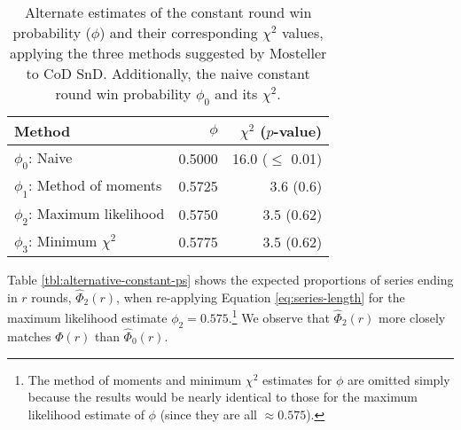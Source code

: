 \documentclass{article}
\begin{document}
\begin{table}

\caption{Alternate estimates of the constant round win probability ($\phi$) and their corresponding $\chi^2$ values, applying the three methods suggested by Mosteller to CoD SnD. Additionally, the naive constant round win probability $\phi_0$ and its $\chi^2$.}

\centering
\begin{tabular}{lrr}
\toprule
Method & $\phi$ & $\chi^2$ ($p$-value) \\
\midrule

$\phi_0$: Naive & 0.5000 & 16.0 ($\leq$ 0.01) \\
$\phi_1$: Method of moments & 0.5725 & 3.6 (0.6) \\
$\phi_2$: Maximum likelihood & 0.5750 & 3.5 (0.62) \\
$\phi_3$: Minimum $\chi^2$ & 0.5775 & 3.5 (0.62) \\

\bottomrule
\end{tabular}

\label{tbl:mosteller-methods-results}

\end{table}

Table \ref{tbl:alternative-constant-ps} shows the expected proportions
of series ending in \(r\) rounds, \(\hat{\Phi}_2(r)\), when re-applying
Equation \ref{eq:series-length} for the maximum likelihood estimate
\(\phi_2 = 0.575\).\footnote{The method of moments and minimum
  \(\chi^2\) estimates for \(\phi\) are omitted simply because the
  results would be nearly identical to those for the maximum likelihood
  estimate of \(\phi\) (since they are all \(\approx 0.575\)).} We
observe that \(\hat{\Phi}_2(r)\) more closely matches \(\Phi(r)\) than
\(\hat{\Phi}_0(r)\).
\end{document}
